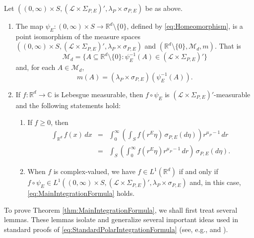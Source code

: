 \documentclass[smallextended]{svjour3}
\theoremstyle{remark}
\begin{document}
\begin{theorem}\label{thm:MainIntegrationFormula}
Let $((0,\infty)\times S,(\mathcal{L}\times\Sigma_{P,E})',\lambda_P\times\sigma_{P,E})$ be as above.
\begin{enumerate}
\item\label{item:MainIntegrationFormula1} The map $\psi_E: (0,\infty)\times S\to\mathbb{R}^d\setminus\{0\}$, defined by \eqref{eq:Homeomorphism}, is a point isomorphism of the measure spaces $((0,\infty)\times S,(\mathcal{L}\times\Sigma_{P,E})',\lambda_P\times\sigma_{P,E})$ and $(\mathbb{R}^d\setminus\{0\},\mathcal{M}_d,m)$. That is
\begin{equation*}
\mathcal{M}_d=\{A\subseteq \mathbb{R}^d\setminus\{0\}:\psi_E^{-1}(A)\in(\mathcal{L}\times\Sigma_{P,E})'\}
\end{equation*}
and, for each $A\in\mathcal{M}_d$,
\begin{equation*}
m(A)=(\lambda_P\times\sigma_{P,E})(\psi_E^{-1}(A)).
\end{equation*}
\item\label{item:MainintegrationFormula2} If $f:\mathbb{R}^d\to\mathbb{C}$ is Lebesgue measurable, then $f\circ \psi_E$ is $(\mathcal{L}\times\Sigma_{P,E})'$-measurable and the following statements hold:
\begin{enumerate}
\item If $f\geq 0$, then
\begin{eqnarray}\label{eq:MainIntegrationFormula}
\int_{\mathbb{R}^d}f(x)\,dx&=&\int_0^\infty\left(\int_S f(r^E\eta)\,\sigma_{P,E}(d\eta)\right)r^{\mu_P-1}\,dr\nonumber \\
&=&\int_S\left(\int_0^\infty f(r^E\eta)r^{\mu_P-1}\,dr\right)\,\sigma_{P,E}(d\eta).
\end{eqnarray}
\item When $f$ is complex-valued, we have 
$f\in L^1(\mathbb{R}^d)$ if and only if $f\circ\psi_E\in L^1((0,\infty)\times S,(\mathcal{L}\times \Sigma_{P,E})',\lambda_P\times\sigma_{P,E})$
and, in this case, \eqref{eq:MainIntegrationFormula} holds.
\end{enumerate}
\end{enumerate}
\end{theorem}

\noindent To prove Theorem \ref{thm:MainIntegrationFormula}, we shall first treat several lemmas. These lemmas isolate and generalize several important ideas used in standard proofs of \eqref{eq:StandardPolarIntegrationFormula} (see, e.g., \cite{folland_real_2013} and \cite{stein_real_2009}). 
\end{document}
